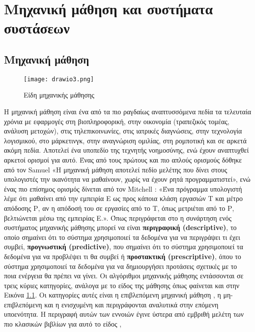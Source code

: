 \chapter{Μηχανική μάθηση και συστήματα συστάσεων}
\label{chap2}
\sloppy
\section{Μηχανική μάθηση}
\renewcommand\figurename{Εικόνα}
\begin{figure}[!htb]
	\centering
	\texttt{[image: drawio3.png]}
	\caption{Είδη μηχανικής μάθησης}
	\label{fig:ml}
\end{figure}
\noindent Η μηχανική μάθηση είναι ένα από τα πιο ραγδαίως αναπτυσσόμενα πεδία τα τελευταία χρόνια με εφαρμογές στη βιοπληροφορική, στην οικονομία (τραπεζικός τομέας, ανάλυση μετοχών), στις τηλεπικοινωνίες, στις ιατρικές διαγνώσεις, στην τεχνολογία λογισμικού, στο μάρκετινγκ, στην αναγνώριση ομιλίας, στη ρομποτική και σε αρκετά ακόμη πεδία. Αποτελεί ένα υποπεδίο της τεχνητής νοημοσύνης, ενώ έχουν αναπτυχθεί αρκετοί ορισμοί για αυτό. Ένας από τους πρώτους και πιο απλούς ορισμούς δόθηκε από τον Samuel\cite{samuelStudiesMachineLearning1959a} «Η μηχανική μάθηση αποτελεί πεδίο μελέτης που δίνει στους υπολογιστές την ικανότητα να μαθαίνουν, χωρίς να έχουν ρητά προγραμματιστεί», ενώ ένας πιο επίσημος ορισμός δίνεται από τον Mitchell \cite{mitchellMachineLearning1997}: «Ένα πρόγραμμα υπολογιστή λέμε ότι μαθαίνει από την εμπειρία Ε ως προς κάποια κλάση εργασιών Τ και μέτρο απόδοσης Ρ, αν η απόδοσή του σε εργασίες από το Τ, όπως μετριέται από το Ρ, βελτιώνεται μέσω της εμπειρίας Ε.».
Όπως περιγράφεται στο \cite{maloneARTIFICIALINTELLIGENCEFUTURE} η συνάρτηση ενός συστήματος μηχανικής μάθησης μπορεί να είναι \textbf{περιγραφική (descriptive)}, το οποίο σημαίνει ότι το σύστημα χρησιμοποιεί τα δεδομένα για να περιγράψει τι έχει συμβεί, \textbf{προγνωστική (predictive)}, που σημαίνει ότι το σύστημα χρησιμοποιεί τα δεδομένα για να προβλέψει τι θα συμβεί ή \textbf{προστακτική (prescriptive)}, όπου το σύστημα χρησιμοποιεί τα δεδομένα για να δημιουργήσει προτάσεις σχετικές με το ποια ενέργεια θα πρέπει να γίνει.
Οι αλγόριθμοι μηχανικής μάθησης εντάσσονται σε τρεις κύριες κατηγορίες, ανάλογα με το είδος της μάθησης όπως φαίνεται και στην Εικόνα \ref{fig:ml}. Οι κατηγορίες αυτές είναι η επιβλεπόμενη μηχανική μάθηση , η μη-επιβλεπόμενη  και η ενισχυμένη 
 και περιγράφονται αναλυτικά στην επόμενη υποενότητα. Η περιγραφή αυτών των εννοιών έγινε ύστερα από εμβριθή μελέτη των πιο κλασικών βιβλίων για αυτό το είδος \cite{burkovHundredPageMachineLearning2019}, \cite{hastie2009elements}



